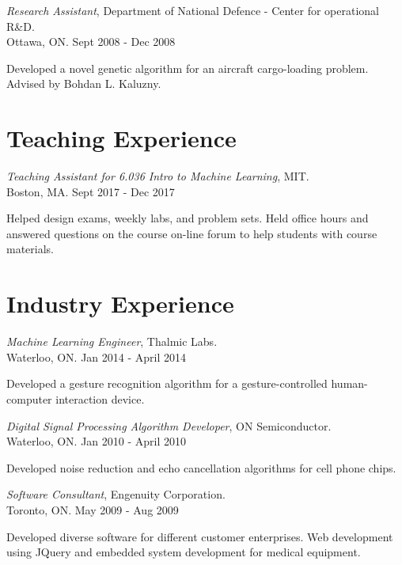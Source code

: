 \documentclass[line,margin,letterpaper]{res}
\begin{document}
\begin{resume}
{\sl Research Assistant}, Department of National Defence - Center for operational R\&D.
\\ \hfill Ottawa, ON. Sept 2008 - Dec 2008
\begin{list}{}
\item Developed a novel genetic algorithm for an aircraft cargo-loading problem.  Advised by Bohdan L. Kaluzny.
\end{list}

\section{Teaching Experience}
{\sl Teaching Assistant for 6.036 Intro to Machine Learning}, MIT.
\\ \hfill Boston, MA. Sept 2017 - Dec 2017
\begin{list}{}
\item  Helped design exams, weekly labs, and problem sets. Held office hours
and answered questions on the course on-line forum to help students with course
materials.
\end{list}

\section{Industry Experience}
{\sl Machine Learning Engineer}, Thalmic Labs.
\\ \hfill Waterloo, ON. Jan 2014 - April 2014
\begin{list}{}
\item  Developed a gesture recognition algorithm for a gesture-controlled human-computer interaction device.
\end{list}

{\sl Digital Signal Processing Algorithm Developer}, ON Semiconductor.
\\ \hfill Waterloo, ON. Jan 2010 - April 2010
\begin{list}{}
\item Developed noise reduction and echo cancellation algorithms for cell phone chips.
\end{list}

{\sl Software Consultant}, Engenuity Corporation.
\\ \hfill Toronto, ON. May 2009 - Aug 2009
\begin{list}{}
\item Developed diverse software for different customer enterprises. Web development using JQuery and embedded system development for medical equipment.
\end{list}




\end{resume}
\end{document}
